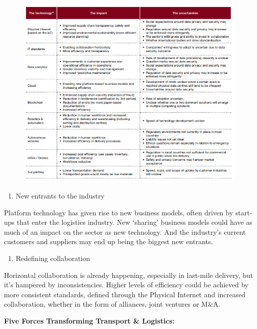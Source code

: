 \documentclass[]{book}
\providecommand{\tightlist}{%
  \setlength{\itemsep}{0pt}\setlength{\parskip}{0pt}}
\begin{document}
\begin{figure}
\centering
\includegraphics{pwc2.PNG}
\caption{}
\end{figure}

\begin{enumerate}
\def\labelenumi{\arabic{enumi}.}
\setcounter{enumi}{2}
\tightlist
\item
  New entrants to the industry
\end{enumerate}

Platform technology has given rise to new business models, often driven
by start-ups that enter the logistics industry. New `sharing' business
models could have as much of an impact on the sector as new technology.
And the industry's current customers and suppliers may end up being the
biggest new entrants.

\begin{enumerate}
\def\labelenumi{\arabic{enumi}.}
\setcounter{enumi}{3}
\tightlist
\item
  Redefining collaboration
\end{enumerate}

Horizontal collaboration is already happening, especially in last-mile
delivery, but it's hampered by inconsistencies. Higher levels of
efficiency could be achieved by more consistent standards, defined
through the Physical Internet and increased collaboration, whether in
the form of alliances, joint ventures or M\&A.

\textbf{Five Forces Transforming Transport \& Logistics:}
\end{document}
